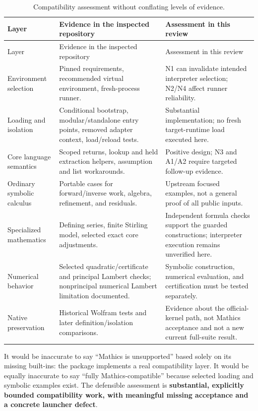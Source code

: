 \documentclass[11pt,letterpaper]{article}
\begin{document}
\begin{longtable}{@{}P{1.25in}P{2.55in}P{2.52in}@{}}
\caption{Compatibility assessment without conflating levels of evidence.}\label{tab:compatibility}\\
\toprule
Layer & Evidence in the inspected repository & Assessment in this review \\
\midrule\endfirsthead
\toprule Layer & Evidence in the inspected repository & Assessment in this review \\
\midrule\endhead
Environment selection & Pinned requirements, recommended virtual environment, fresh-process runner. & N1 can invalidate intended interpreter selection; N2/N4 affect runner reliability. \\
Loading and isolation & Conditional bootstrap, modular/standalone entry points, removed adapter context, load/reload tests. & Substantial implementation; no fresh target-runtime load executed here. \\
Core language semantics & Scoped returns, lookup and held extraction helpers, assumption and list workarounds. & Positive design; N3 and A1/A2 require targeted follow-up evidence. \\
Ordinary symbolic calculus & Portable cases for forward/inverse work, algebra, refinement, and residuals. & Upstream focused examples, not a general proof of all public inputs. \\
Specialized mathematics & Defining series, finite Stirling model, selected exact core adjustments. & Independent formula checks support the guarded constructions; interpreter execution remains unverified here. \\
Numerical behavior & Selected quadratic/certificate and principal Lambert checks; nonprincipal numerical Lambert limitation documented. & Symbolic construction, numerical evaluation, and certification must be tested separately. \\
Native preservation & Historical Wolfram tests and later definition/isolation comparisons. & Evidence about the official-kernel path, not Mathics acceptance and not a new current full-suite result. \\
\bottomrule
\end{longtable}

It would be inaccurate to say ``Mathics is unsupported'' based solely on its missing built-ins: the package implements a real compatibility layer. It would be equally inaccurate to say ``fully Mathics-compatible'' because selected loading and symbolic examples exist. The defensible assessment is \textbf{substantial, explicitly bounded compatibility work, with meaningful missing acceptance and a concrete launcher defect}.~\cite{mathicsguide}
\end{document}
